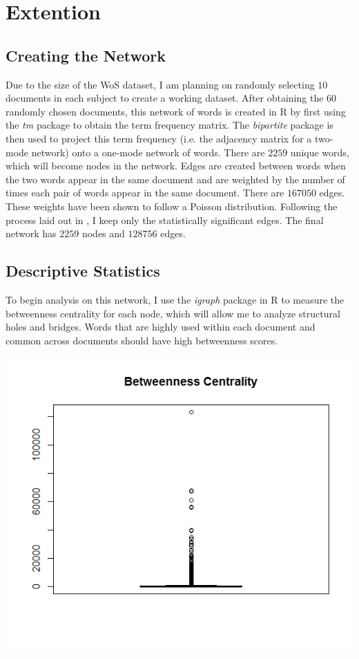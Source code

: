 \documentclass[12pt]{article}
\begin{document}
\section{Extention}
\subsection{Creating the Network}
Due to the size of the WoS dataset, I am planning on randomly selecting $10$ documents in each subject to create a working dataset. After obtaining the $60$ randomly chosen documents, this network of words is created in R by first using the \textit{tm} package to obtain the term frequency matrix. The \textit{bipartite} package is then used to project this term frequency (i.e. the adjacency matrix for a two-mode network) onto a one-mode network of words. There are $2259$ unique words, which will become nodes in the network. Edges are created between words when the two words appear in the same document and are weighted by the number of times each pair of words appear in the same document. There are $167050$ edges. These weights have been shown to follow a Poisson distribution. Following the process laid out in \cite{mainExtra}, I keep only the statistically significant edges. The final network has $2259$ nodes and $128756$ edges. 
  
\subsection{Descriptive Statistics}
To begin analysis on this network, I use the \textit{igraph} package in R to measure the betweenness centrality for each node, which will allow me to analyze structural holes and bridges. Words that are highly used within each document and common across documents should have high betweenness scores.
 
\vspace{2mm}
\begin{center}
	\includegraphics[scale=0.5]{Images/plot_between.jpeg}
\end{center} 
\vspace{2mm}  
\end{document}
